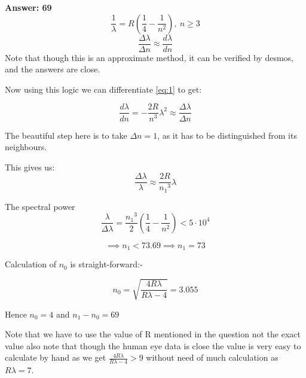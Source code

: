 \documentclass[11pt,a4paper]{scrartcl}
\begin{document}
\begin{solution}
{\Large{\textbf{Answer: 69 }}}\\

\begin{equation*}
    \boxed{\frac{1}{\lambda}=R(\frac{1}{4}-\frac{1}{n^2}),\  n \geq 3}
    \label{eq:1}
\end{equation*}
$$\frac{\Delta \lambda}{\Delta n}\approx \frac{d \lambda}{d n} $$
Note that though this is an approximate method, it can be verified by desmos, and the answers are close.

Now using this logic we can differentiate \eqref{eq:1} to get:

$$\frac{d \lambda}{d n} =-\frac{2R}{n^3} {\lambda}^2 \approx \frac{\Delta \lambda}{\Delta n}$$



The beautiful step here is to take $\Delta n = 1$, as it has to be distinguished from its neighbours.

This gives us: $$\frac{\Delta \lambda}{ \lambda} \approx \frac{2R}{{n_1}^3}\lambda $$

The spectral power $$\frac{\lambda}{\Delta \lambda}=\frac{{n_1}^3}{2}(\frac{1}{4}-\frac{1}{n^2})<5\cdot 10^4$$

$$\implies n_1 < 73.69 \implies \boxed{n_1=73}$$

Calculation of $n_0$ is straight-forward:-

\begin{equation*}
    n_0=\sqrt{\frac{4R\lambda}{R\lambda - 4}}=3.055
\end{equation*}

Hence $n_0=4$ and $\boxed{n_1-n_0=69}$

Note that we have to use the value of R mentioned in the question not the exact value also note that though the human eye data is close the value is very easy to calculate by hand as we get $\frac{4R\lambda}{R\lambda - 4} > 9$ without need of much calculation as $R\lambda=7$.






\end{solution}
\vspace{10mm}%
\end{document}
